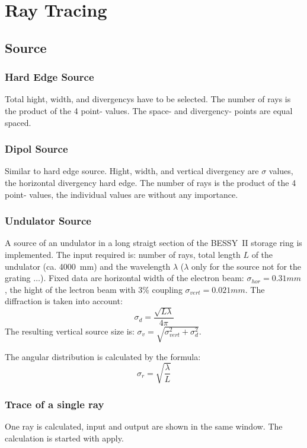 

\chapter{Ray Tracing}   

\section{Source}
\subsection{Hard Edge Source} 
Total hight, width, and divergencys have to be selected. The number of rays is
the product of the 4 point- values.  The space- and divergency- points are
equal spaced.

\subsection{Dipol Source} 
Similar to hard edge source. Hight, width, and vertical divergency are $\sigma$
values, the horizontal divergency hard edge. The number of rays is
the product of the 4 point- values, the individual values are without any
importance.

\subsection{Undulator Source} 

A source of an undulator in a long straigt section of the
BESSY~II storage ring is implemented. The input required is: number of rays,
total length $L$ of the undulator (ca. 4000~mm) and the wavelength $ \lambda$
($\lambda$ only for the source not for the grating $\ldots$). 
Fixed data are  
horizontal width of the electron beam: $\sigma_{hor} = 0.31 mm$, the hight of 
the lectron beam with 3\% coupling $\sigma_{vert} = 0.021 mm$. The diffraction 
is taken into account:
\[ \sigma_d = \frac{\sqrt{L \lambda}}{4\pi} \] 
The resulting vertical source size is: 
$\sigma_{v}=\sqrt{\sigma_{vert}^2+\sigma_d^2}$.

The angular distribution is calculated by the formula:
\[ \sigma_r= \sqrt{\frac{\lambda}{L}} \]

\subsection {Trace of a single ray}
One ray is calculated, input and output are shown in the same window. The
calculation is started with apply.

